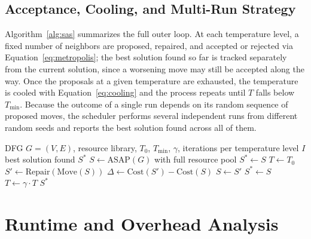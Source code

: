 \documentclass[conference]{IEEEtran}
\begin{document}
    \subsection{Acceptance, Cooling, and Multi-Run Strategy}
    \label{sec:sa-accept}

    Algorithm~\ref{alg:sas} summarizes the full outer loop. At each temperature level, a fixed number
    of neighbors are proposed, repaired, and accepted or rejected via Equation~\eqref{eq:metropolis};
    the best solution found so far is tracked separately from the current solution, since a worsening
    move may still be accepted along the way. Once the proposals at a given temperature are exhausted,
    the temperature is cooled with Equation~\eqref{eq:cooling} and the process repeats until $T$ falls
    below $T_{\min}$. Because the outcome of a single run depends on its random sequence of proposed
    moves, the scheduler performs several independent runs from different random seeds and reports the
    best solution found across all of them.

    \begin{algorithm}[t]
        \caption{Simulated Annealing Scheduling (SAS)}
        \label{alg:sas}
        \begin{algorithmic}[1]
            \REQUIRE DFG $G = (V, E)$, resource library, $T_0$, $T_{\min}$, $\gamma$, iterations per
            temperature level $I$
            \ENSURE best solution found $S^\ast$
            \STATE $S \leftarrow \text{ASAP}(G)$ with full resource pool
            \STATE $S^\ast \leftarrow S$
            \STATE $T \leftarrow T_0$
                    \STATE $S' \leftarrow \text{Repair}(\text{Move}(S))$
                    \STATE $\Delta \leftarrow \text{Cost}(S') - \text{Cost}(S)$
                        \STATE $S \leftarrow S'$
                            \STATE $S^\ast \leftarrow S$
                        \ENDIF
                    \ENDIF
                \ENDFOR
                \STATE $T \leftarrow \gamma \cdot T$
            \ENDWHILE
            \RETURN $S^\ast$
        \end{algorithmic}
    \end{algorithm}

    \section{Runtime and Overhead Analysis}
    \label{sec:overhead}
\end{document}
